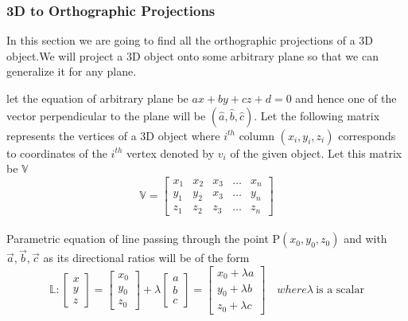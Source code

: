 \subsubsection{3D to Orthographic Projections}
\indent In this section we are going to find all the orthographic projections of a 3D object.We will project a 3D object onto some arbitrary plane so that we can generalize it for any plane.\par
let the equation of arbitrary plane be \(ax+by+cz+d=0\) and hence one of the vector perpendicular to the plane will be $(\hat{a},\hat{b},\hat{c})$. Let the following matrix represents the vertices of a 3D object where \(i^{th}\) column \:\((x_i,y_i,z_i)\) corresponds to coordinates of the \(i^{th}\) vertex denoted by $v_i$ of the given object. Let this matrix be $\mathbb{V}$
 \[
 \mathbb{V} =  
 \begin{bmatrix}
    x_{1}       & x_{2} & x_{3} & \dots & x_{n} \\
    y_{1}       & y_{2} & x_{3} & \dots & y_{n} \\
    z_{1}       & z_{2} & z_{3} & \dots & z_{n}
\end{bmatrix}
\label{e1}\]\\
Parametric equation of line passing through the point P\((x_0,y_0,z_0)\) and with $ \vec{a}, \vec{b}, \vec{c}$ as its directional ratios will be of the form  \[ 
		\mathbb{L} :   \begin{bmatrix}
         x  \\
         y    \\
         z     
         \end{bmatrix} 
         =
         \begin{bmatrix}
         x_0   \\
         y_0    \\
         z_0     
         \end{bmatrix} + \lambda
         \begin{bmatrix}
         a  \\
         b    \\
         c     
         \end{bmatrix} 
         =
         \begin{bmatrix}
         x_0 + \lambda a\\
         y_0 + \lambda b \\
         z_0 + \lambda c 
         \end{bmatrix}
         \quad where \lambda \  \textrm{is a scalar} \]\\
